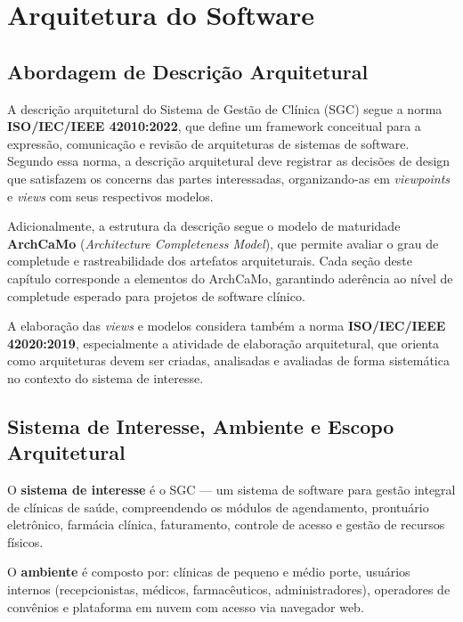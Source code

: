 \chapter{Arquitetura do Software}

\section{Abordagem de Descrição Arquitetural}

A descrição arquitetural do Sistema de Gestão de Clínica (SGC) segue a norma \textbf{ISO/IEC/IEEE 42010:2022}, que define um framework conceitual para a expressão, comunicação e revisão de arquiteturas de sistemas de software. Segundo essa norma, a descrição arquitetural deve registrar as decisões de design que satisfazem os concerns das partes interessadas, organizando-as em \textit{viewpoints} e \textit{views} com seus respectivos modelos.

Adicionalmente, a estrutura da descrição segue o modelo de maturidade \textbf{ArchCaMo} (\textit{Architecture Completeness Model}), que permite avaliar o grau de completude e rastreabilidade dos artefatos arquiteturais. Cada seção deste capítulo corresponde a elementos do ArchCaMo, garantindo aderência ao nível de completude esperado para projetos de software clínico.

A elaboração das \textit{views} e modelos considera também a norma \textbf{ISO/IEC/IEEE 42020:2019}, especialmente a atividade de elaboração arquitetural, que orienta como arquiteturas devem ser criadas, analisadas e avaliadas de forma sistemática no contexto do sistema de interesse.

\section{Sistema de Interesse, Ambiente e Escopo Arquitetural}

O \textbf{sistema de interesse} é o SGC --- um sistema de software para gestão integral de clínicas de saúde, compreendendo os módulos de agendamento, prontuário eletrônico, farmácia clínica, faturamento, controle de acesso e gestão de recursos físicos.

O \textbf{ambiente} é composto por: clínicas de pequeno e médio porte, usuários internos (recepcionistas, médicos, farmacêuticos, administradores), operadores de convênios e plataforma em nuvem com acesso via navegador web.


